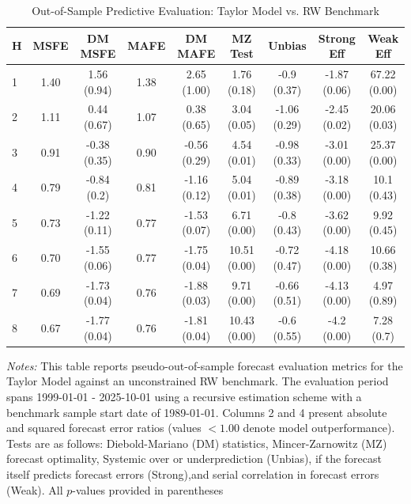 \begin{table}[htbp]
\centering
\caption{Out-of-Sample Predictive Evaluation: Taylor Model vs. RW Benchmark}
\label{tab:taylor_model_evaluation}
\footnotesize
\begin{tabular}{l cccccccc}
\hline\hline
\rule{0pt}{3ex}
\textbf{H} & \textbf{MSFE} & \textbf{DM MSFE} & \textbf{MAFE} & \textbf{DM MAFE} & \textbf{MZ Test} & \textbf{Unbias} & \textbf{Strong Eff} & \textbf{Weak Eff} \\[0.5ex]
\hline
\rule{0pt}{2.5ex}
1 & 1.40 & 1.56 (0.94) & 1.38 & 2.65 (1.00) & 1.76 (0.18) & -0.9 (0.37) & -1.87 (0.06) & 67.22 (0.00) \\
2 & 1.11 & 0.44 (0.67) & 1.07 & 0.38 (0.65) & 3.04 (0.05) & -1.06 (0.29) & -2.45 (0.02) & 20.06 (0.03) \\
3 & 0.91 & -0.38 (0.35) & 0.90 & -0.56 (0.29) & 4.54 (0.01) & -0.98 (0.33) & -3.01 (0.00) & 25.37 (0.00) \\
4 & 0.79 & -0.84 (0.2) & 0.81 & -1.16 (0.12) & 5.04 (0.01) & -0.89 (0.38) & -3.18 (0.00) & 10.1 (0.43) \\
5 & 0.73 & -1.22 (0.11) & 0.77 & -1.53 (0.07) & 6.71 (0.00) & -0.8 (0.43) & -3.62 (0.00) & 9.92 (0.45) \\
6 & 0.70 & -1.55 (0.06) & 0.77 & -1.75 (0.04) & 10.51 (0.00) & -0.72 (0.47) & -4.18 (0.00) & 10.66 (0.38) \\
7 & 0.69 & -1.73 (0.04) & 0.76 & -1.88 (0.03) & 9.71 (0.00) & -0.66 (0.51) & -4.13 (0.00) & 4.97 (0.89) \\
8 & 0.67 & -1.77 (0.04) & 0.76 & -1.81 (0.04) & 10.43 (0.00) & -0.6 (0.55) & -4.2 (0.00) & 7.28 (0.7) \\
\hline\hline
\end{tabular}%
\par\smallskip
\parbox{\textwidth}{\scriptsize \textit{Notes:} This table reports pseudo-out-of-sample forecast evaluation metrics for the Taylor Model against an unconstrained RW benchmark. The evaluation period spans 1999-01-01 - 2025-10-01 using a recursive estimation scheme with a benchmark sample start date of 1989-01-01. Columns 2 and 4 present absolute and squared forecast error ratios (values $< 1.00$ denote model outperformance). Tests are as follows: Diebold-Mariano (DM) statistics, Mincer-Zarnowitz (MZ) forecast optimality, Systemic over or underprediction (Unbias), if the forecast itself predicts forecast errors (Strong),and serial correlation in forecast errors (Weak). All $p$-values provided in parentheses}
\end{table}
